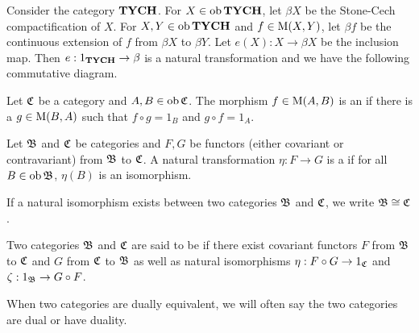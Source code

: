 \begin{example}
	Consider the category \( \bf{TYCH} \).  For \( X \in \operatorname{ob}{\bf{TYCH}} \), let \( \beta{X} \) be the Stone-Cech compactification of \( X \).  For \( X,Y \in \operatorname{ob}{\bf{TYCH}} \) and \( f \in \operatorname{M}(X,Y) \), let \( \beta{f} \) be the continuous extension of \( f \) from \( \beta{X} \) to \( \beta{Y} \).  Let \( e(X): X \to \beta{X} \) be the inclusion map.  Then \( e: 1_{\bf{TYCH}} \to \beta \) is a natural transformation and we have the following commutative diagram.
\end{example}

\begin{definition}
	Let \( \mathfrak{C} \) be a category and \( A,B \in \operatorname{ob}{\mathfrak{C}} \).  The morphism \( f \in \operatorname{M}(A,B) \) is an  if there is a \( g \in \operatorname{M}(B,A) \) such that \( f \circ g = 1_B \) and \( g \circ f = 1_A \).
\end{definition}

\begin{definition}
	Let \( \mathfrak{B} \) and \( \mathfrak{C} \) be categories and \( F, G \) be functors (either covariant or contravariant) from \( \mathfrak{B} \) to \( \mathfrak{C} \).  A natural transformation \( \eta:F \to G \) is a  if for all \( B \in \operatorname{ob}{\mathfrak{B}} \), \( \eta(B) \) is an isomorphism.
\end{definition}

If a natural isomorphism exists between two categories \( \mathfrak{B} \) and \( \mathfrak{C} \), we write \( \mathfrak{B} \cong \mathfrak{C} \).

\begin{definition}
	Two categories \( \mathfrak{B} \) and \( \mathfrak{C} \) are said to be   if there exist covariant functors  \( F \) from \( \mathfrak{B} \) to \( \mathfrak{C} \) and \( G \) from \( \mathfrak{C} \) to \( \mathfrak{B} \) as well as natural isomorphisms \( \eta: F \circ G \to 1_{\mathfrak{C}} \) and \( \zeta: 1_{\mathfrak{B}} \to G \circ F \).
\end{definition}

When two categories are dually equivalent, we will often say the two categories are dual or have duality.


